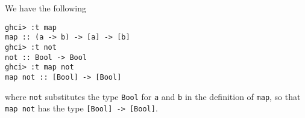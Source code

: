 
We have the following
\scriptsize\begin{verbatim}
ghci> :t map
map :: (a -> b) -> [a] -> [b]
ghci> :t not
not :: Bool -> Bool
ghci> :t map not
map not :: [Bool] -> [Bool]
\end{verbatim}\normalsize
where \verb|not| substitutes the type \verb|Bool| for \verb|a| and \verb|b| in the 
definition of \verb|map|, so that \verb|map not| has the type \verb|[Bool] -> [Bool]|.
